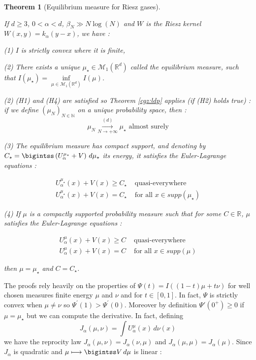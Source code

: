 \documentclass[a4paper,12pt]{report}
\newtheorem{thm}{Theorem}
\begin{document}
\begin{thm}[Equilibrium measure for Riesz gases]\label{cgz-riez}

If $d \geq 3$, $0 < \alpha < d$, $\beta_{N} \gg N \log(N)$ and $W$ is the Riesz kernel $W(x, y) = k_{\alpha}(y-x)$, we have :

(1) $I$ is strictly convex where it is finite,

(2) There exists a unique $\mu_{\star} \in \mathcal{M}_{1}(\mathbb{R}^{d})$ called the equilibrium measure, such that $I(\mu_{\star}) = \underset{\mu \in \mathcal{M}_{1}(\mathbb{R}^{d})}{\inf} I(\mu)$.

(2) (H1) and (H4) are satisfied so Theorem \ref{cgz:ldp} applies (if (H2) holds true) : if we define $(\mu_{N})_{N \in \mathbb{N}}$ on a unique probability space, then :
\[\mu_{N} \overset{(d)}{\underset{N \longrightarrow + \infty}{\longrightarrow}} \mu_{\star} \text{  almost surely}\]

(3) The equilibrium measure has compact support, and denoting by $C_{\star} = \bigintss \left( U_{\alpha}^{\mu_{\star}} + V\right)\,d\mu_{\star}$ its energy, it satisfies the Euler-Lagrange equations :

\begin{align*}
U_{\alpha}^{\mu_{\star}}(x) + V(x) \geq C_{\star} & \text{  quasi-everywhere}\\
U_{\alpha}^{\mu_{\star}}(x) + V(x) = C_{\star} & \text{  for all } x\in supp(\mu_{\star}) 
\end{align*}

(4) If $\mu$ is a compactly supported probability measure such that for some $C \in \mathbb{R}$, $\mu$ satisfies the Euler-Lagrange equations :

\begin{align*}
U_{\alpha}^{\mu}(x) + V(x) \geq C & \text{  quasi-everywhere}\\
U_{\alpha}^{\mu}(x) + V(x) = C & \text{  for all } x\in supp(\mu) 
\end{align*}

then $\mu = \mu_{\star}$ and $C = C_{\star}$.

\end{thm}

The proofs rely heavily on the properties of $\Psi (t) = I((1-t)\mu + t\nu)$ for well chosen measures finite energy $\mu$ and $\nu$ and for $t \in [0, 1]$. In fact, $\Psi$ is strictly convex when $\mu \neq \nu$ so $\Psi^{'}(1) > \Psi^{'}(0)$. Moreover by definition $\Psi'(0^{+}) \geq 0$ if $\mu = \mu_{\star}$ but we can compute the derivative. In fact, defining 
\[J_{\alpha}(\mu, \nu) = \int U_{\alpha}^{\mu}(x)\,d\nu(x)\]
we have the reprocity law $J_{\alpha}(\mu, \nu) = J_{\alpha}(\nu, \mu)$ and $J_{\alpha}(\mu, \mu) = J_{\alpha}(\mu)$. Since $J_{\alpha}$ is quadratic and $\mu \longmapsto\bigintss V\,d\mu$ is linear :
\end{document}
